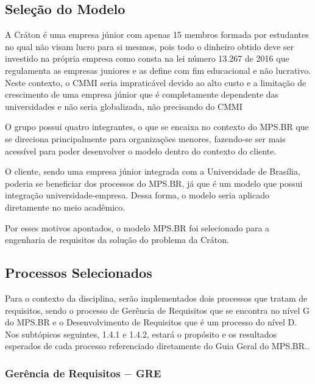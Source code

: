 \subsection{Seleção do Modelo}

  A Cráton é uma empresa júnior com apenas 15 membros formada por estudantes no qual
  não visam lucro para si mesmos, pois todo o dinheiro obtido deve ser investido
  na própria empresa como consta na lei número 13.267 de 2016 que regulamenta as empresas
  juniores e as define com fim educacional e não lucrativo. Neste contexto, o CMMI seria
  impraticável devido ao alto custo e a limitação de crescimento de uma empresa júnior que é
  completamente dependente das universidades e não seria globalizada, não precisando do CMMI

  O grupo possui quatro integrantes, o que se encaixa no contexto do MPS.BR que se direciona
  principalmente para organizações menores, fazendo-se ser mais acessível para poder desenvolver
  o modelo dentro do contexto do cliente.

  O cliente, sendo uma empresa júnior integrada com a Universidade de Brasília, poderia se
  beneficiar dos processos do MPS.BR, já que é um modelo que possui integração universidade-empresa.
  Dessa forma, o modelo seria aplicado diretamente no meio acadêmico.

  Por esses motivos apontados, o modelo MPS.BR foi selecionado para a engenharia de requisitos da
  solução do problema da Cráton.

\subsection{Processos Selecionados}

  Para o contexto da disciplina, serão implementados dois processos que tratam de
  requisitos, sendo o processo de Gerência de Requisitos que se encontra no nível
  G do MPS.BR e o Desenvolvimento de Requisitos que é um processo do nível D. Nos
  subtópicos seguintes, 1.4.1 e 1.4.2, estará o propósito e os resultados esperados
  de cada processo referenciado diretamente do Guia Geral do MPS.BR.\cite{softexmps}.

\subsubsection{Gerência de Requisitos $-$ GRE}

